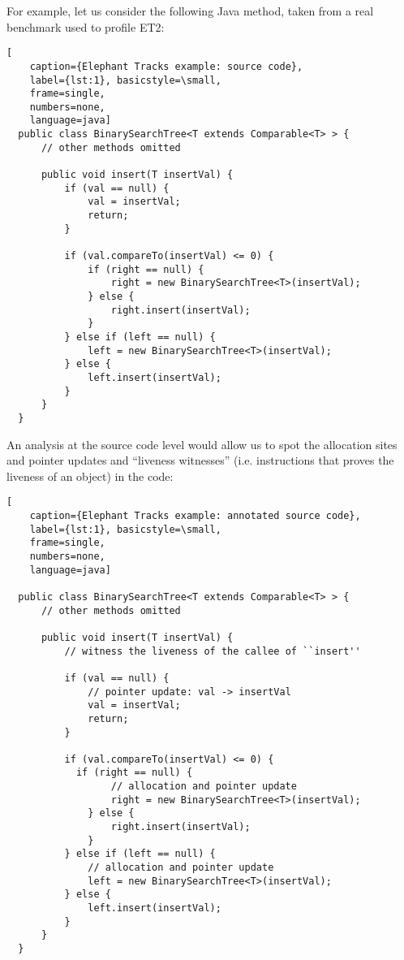 For example, let us consider the following Java method, taken from a real benchmark used to profile ET2:
\begin{lstlisting}[
    caption={Elephant Tracks example: source code},
    label={lst:1}, basicstyle=\small,
    frame=single,
    numbers=none,
    language=java]
  public class BinarySearchTree<T extends Comparable<T> > {
      // other methods omitted
    
      public void insert(T insertVal) {
          if (val == null) {
              val = insertVal;
              return;
          }

          if (val.compareTo(insertVal) <= 0) {
              if (right == null) {
                  right = new BinarySearchTree<T>(insertVal);
              } else {
                  right.insert(insertVal);
              }
          } else if (left == null) {
              left = new BinarySearchTree<T>(insertVal);
          } else {
              left.insert(insertVal);
          }
      }
  }
\end{lstlisting}

An analysis at the source code level would allow us to spot the allocation sites and pointer updates and
``liveness witnesses'' (i.e. instructions that proves the liveness of an object) in the code:
\begin{lstlisting}[
    caption={Elephant Tracks example: annotated source code},
    label={lst:1}, basicstyle=\small,
    frame=single,
    numbers=none,
    language=java]

  public class BinarySearchTree<T extends Comparable<T> > {
      // other methods omitted
      
      public void insert(T insertVal) {
          // witness the liveness of the callee of ``insert''
        
          if (val == null) {
              // pointer update: val -> insertVal
              val = insertVal;
              return;
          }

          if (val.compareTo(insertVal) <= 0) {
            if (right == null) {
                  // allocation and pointer update
                  right = new BinarySearchTree<T>(insertVal);
              } else {
                  right.insert(insertVal);
              }
          } else if (left == null) {
              // allocation and pointer update
              left = new BinarySearchTree<T>(insertVal);
          } else {
              left.insert(insertVal);
          }
      }
  }
\end{lstlisting}


